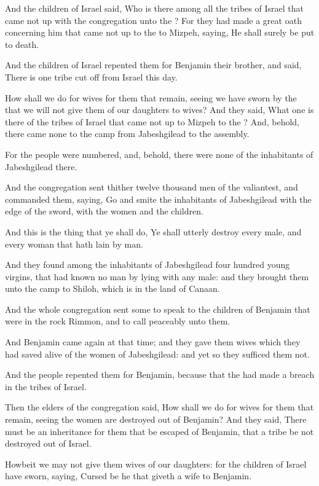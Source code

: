 \verse And the children of Israel said, Who is there among all the tribes of Israel that came not up with the congregation unto the \LORD?  For they had made a great oath concerning him that came not up to the \LORD to Mizpeh, saying, He shall surely be put to death.

\verse And the children of Israel repented them for Benjamin their brother, and said, There is one tribe cut off from Israel this day.

\verse How shall we do for wives for them that remain, seeing we have sworn by the \LORD that we will not give them of our daughters to wives?  \verse And they said, What one is there of the tribes of Israel that came not up to Mizpeh to the \LORD? And, behold, there came none to the camp from Jabeshgilead to the assembly.

\verse For the people were numbered, and, behold, there were none of the inhabitants of Jabeshgilead there.

\verse And the congregation sent thither twelve thousand men of the valiantest, and commanded them, saying, Go and smite the inhabitants of Jabeshgilead with the edge of the sword, with the women and the children.

\verse And this is the thing that ye shall do, Ye shall utterly destroy every male, and every woman that hath lain by man.

\verse And they found among the inhabitants of Jabeshgilead four hundred young virgins, that had known no man by lying with any male: and they brought them unto the camp to Shiloh, which is in the land of Canaan.

\verse And the whole congregation sent some to speak to the children of Benjamin that were in the rock Rimmon, and to call peaceably unto them.

\verse And Benjamin came again at that time; and they gave them wives which they had saved alive of the women of Jabeshgilead: and yet so they sufficed them not.

\verse And the people repented them for Benjamin, because that the \LORD had made a breach in the tribes of Israel.

\verse Then the elders of the congregation said, How shall we do for wives for them that remain, seeing the women are destroyed out of Benjamin?  \verse And they said, There must be an inheritance for them that be escaped of Benjamin, that a tribe be not destroyed out of Israel.

\verse Howbeit we may not give them wives of our daughters: for the children of Israel have sworn, saying, Cursed be he that giveth a wife to Benjamin.

